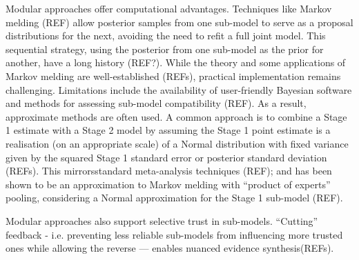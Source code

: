 \documentclass{article}
\begin{document}
Modular approaches offer computational advantages. Techniques like Markov melding (REF) allow posterior samples from one sub-model to serve as a proposal distributions for the next, avoiding the need to refit a full joint model. This sequential strategy, using the posterior from one sub-model as the prior for another, have a long history (REF?). 
While the theory and some applications of Markov melding are well-established (REFs), practical implementation remains challenging. Limitations include the availability of user-friendly Bayesian software 
and methods for assessing sub-model compatibility (REF). As a result, approximate methods are often used. A common approach 
is to combine a Stage 1 estimate with a Stage 2 model by assuming the Stage 1 point estimate is a realisation (on an appropriate scale) of a Normal distribution with fixed variance given by the squared Stage 1 standard error or posterior standard deviation (REFs). This mirrorsstandard meta-analysis techniques (REF); and has been shown to be an approximation to Markov melding with ``product of experts'' pooling, considering a Normal approximation for the Stage 1 sub-model (REF).

Modular approaches also support selective trust in sub-models. ``Cutting'' feedback - i.e. preventing less reliable sub-models from influencing more trusted ones while allowing the reverse — enables nuanced evidence synthesis(REFs).


\end{document}
